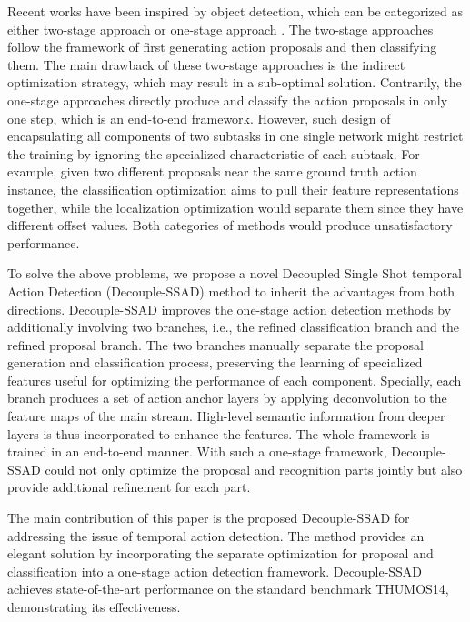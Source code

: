 \documentclass{article}
\begin{document}
Recent works have been inspired by object detection, which can be categorized as either two-stage approach \cite{wang2017untrimmednets,xu2017r,chao2018rethinking,lin2018bsn} or one-stage approach \cite{lin2017single,yeung2016end,sstad_buch_bmvc17}.
The two-stage approaches follow the framework of first generating action proposals and then classifying them. 
The main drawback of these two-stage approaches is the indirect optimization strategy, which may result in a sub-optimal solution.
Contrarily, the one-stage approaches directly produce and classify the action proposals in only one step, which is an end-to-end framework.
However, such design of encapsulating all components of two subtasks in one single network might restrict the training by ignoring the specialized characteristic of each subtask.
For example, given two different proposals near the same ground truth action instance, the classification optimization aims to pull their feature representations together, while the localization optimization would separate them since they have different offset values.
Both categories of methods would produce unsatisfactory performance.

To solve the above problems, we propose a novel Decoupled Single Shot temporal Action Detection (Decouple-SSAD) method to inherit the advantages from both directions.
Decouple-SSAD improves the one-stage action detection methods by additionally involving two branches, i.e., the refined classification branch and the refined proposal branch. 
The two branches manually separate the proposal generation and classification process, preserving the learning of specialized features useful for optimizing the performance of each component.
Specially, each branch produces a set of action anchor layers by applying deconvolution to the feature maps of the main stream.
High-level semantic information from deeper layers is thus incorporated to enhance the features.
The whole framework is trained in an end-to-end manner.
With such a one-stage framework, Decouple-SSAD could not only optimize the proposal and recognition parts jointly but also provide additional refinement for each part.


The main contribution of this paper is the proposed Decouple-SSAD for addressing the issue of temporal action detection.
The method provides an elegant solution by incorporating the separate optimization for proposal and classification into a one-stage action detection framework. Decouple-SSAD achieves state-of-the-art performance on the standard benchmark THUMOS14, demonstrating its effectiveness.
 
\end{document}
